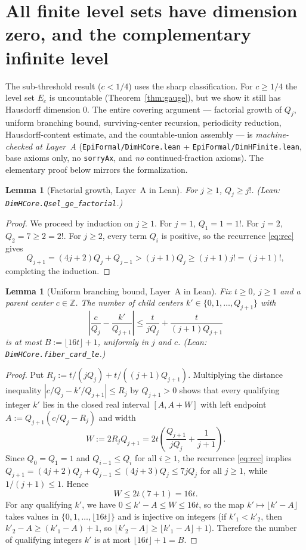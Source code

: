\documentclass[11pt]{article}
\newtheorem{lemma}[theorem]{Lemma}
\theoremstyle{definition}
\theoremstyle{remark}
\newcommand{\Z}{\mathbb{Z}}
\begin{document}
\section{All finite level sets have dimension zero, and the complementary infinite level}\label{sec:finite-levels}

The sub-threshold result ($c<1/4$) uses the sharp classification. For
$c\ge1/4$ the level set $E_c$ is uncountable (Theorem~\ref{thm:gauge}), but we
show it still has Hausdorff dimension $0$. The entire covering argument ---
factorial growth of $Q_j$, uniform branching bound, surviving-center recursion,
periodicity reduction, Hausdorff-content estimate, and the countable-union
assembly --- is \emph{machine-checked at Layer~A}
(\texttt{EpiFormal/DimHCore.lean} + \texttt{EpiFormal/DimHFinite.lean}, base
axioms only, no \texttt{sorryAx}, and \emph{no} continued-fraction axioms).
The elementary proof below mirrors the formalization.

\begin{lemma}[Factorial growth, Layer~A in Lean]\label{lem:factorial}
For $j\ge1$, $Q_j\ge j!$. (Lean: \texttt{DimHCore.\allowbreak Qsel\_ge\_factorial}.)
\end{lemma}

\begin{proof}
We proceed by induction on $j\ge1$. For $j=1$, $Q_1=1=1!$. For $j=2$,
$Q_2=7\ge2=2!$. For $j\ge2$, every term $Q_i$ is positive, so the recurrence
\eqref{eq:rec} gives
\[
Q_{j+1}=(4j+2)Q_j+Q_{j-1}>(j+1)Q_j\ge(j+1)j!=(j+1)!,
\]
completing the induction.
\end{proof}

\begin{lemma}[Uniform branching bound, Layer~A in Lean]\label{lem:branch}
Fix $t\ge0$, $j\ge1$ and a parent center $c\in\Z$. The number of child centers
$k'\in\{0,1,\dots,Q_{j+1}\}$ with
\[
\left|\frac{c}{Q_j}-\frac{k'}{Q_{j+1}}\right|\le \frac{t}{jQ_j}+\frac{t}{(j+1)Q_{j+1}}
\]
is at most $B:=\lfloor16t\rfloor+1$, \emph{uniformly in $j$ and $c$}.
(Lean: \texttt{DimHCore.\allowbreak fiber\_card\_le}.)
\end{lemma}

\begin{proof}
Put $R_j:=t/(jQ_j)+t/((j+1)Q_{j+1})$. Multiplying the distance inequality
$|c/Q_j-k'/Q_{j+1}|\le R_j$ by $Q_{j+1}>0$ shows that every qualifying integer
$k'$ lies in the closed real interval $[A,A+W]$ with left endpoint
$A:=Q_{j+1}(c/Q_j-R_j)$ and width
\[
W:=2R_jQ_{j+1}=2t\left(\frac{Q_{j+1}}{jQ_j}+\frac{1}{j+1}\right).
\]
Since $Q_0=Q_1=1$ and $Q_{i-1}\le Q_i$ for all $i\ge1$, the recurrence
\eqref{eq:rec} implies $Q_{j+1}=(4j+2)Q_j+Q_{j-1}\le(4j+3)Q_j\le7jQ_j$ for all
$j\ge1$, while $1/(j+1)\le1$. Hence
\[
W\le 2t(7+1)=16t.
\]
For any qualifying $k'$, we have $0\le k'-A\le W\le16t$, so the map
$k'\mapsto\lfloor k'-A\rfloor$ takes values in $\{0,1,\dots,\lfloor16t\rfloor\}$
and is injective on integers (if $k'_1<k'_2$, then $k'_2-A\ge(k'_1-A)+1$, so
$\lfloor k'_2-A\rfloor\ge\lfloor k'_1-A\rfloor+1$). Therefore the number of
qualifying integers $k'$ is at most $\lfloor16t\rfloor+1=B$.
\end{proof}
\end{document}
